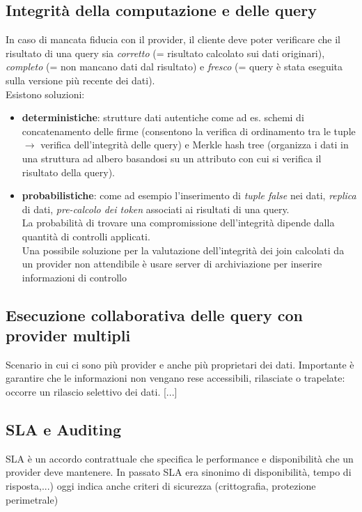 \subsection{Integrità della computazione e delle query}
In caso di mancata fiducia con il provider, il cliente deve poter verificare che il risultato di una query sia \textit{corretto} (= risultato calcolato sui dati originari), \textit{completo} (= non mancano dati dal risultato) e \textit{fresco} (= query è stata eseguita sulla versione più recente dei dati).\\
Esistono soluzioni:
\begin{itemize}
    \item \textbf{deterministiche}: strutture dati autentiche come ad es. schemi di concatenamento delle firme (consentono la verifica di ordinamento tra le tuple $\xrightarrow{}$ verifica dell'integrità delle query) e Merkle hash tree (organizza i dati in una struttura ad albero basandosi su un attributo con cui si verifica il risultato della query).
    \item \textbf{probabilistiche}: come ad esempio l'inserimento di \textit{tuple false} nei dati, \textit{replica} di dati, \textit{pre-calcolo dei token} associati ai risultati di una query.\\
    La probabilità di trovare una compromissione dell'integrità dipende dalla quantità di controlli applicati.\\
    Una possibile soluzione per la valutazione dell'integrità dei join calcolati da un provider non attendibile è usare server di archiviazione per inserire informazioni di controllo    
\end{itemize}
\subsection{Esecuzione collaborativa delle query con provider multipli}
Scenario in cui ci sono più provider e anche più proprietari dei dati. Importante è garantire che le informazioni non vengano rese accessibili, rilasciate o trapelate: occorre un rilascio selettivo dei dati. [...]
\subsection{SLA e Auditing}
SLA è un accordo contrattuale che specifica le performance e disponibilità che un provider deve mantenere. In passato SLA era sinonimo di disponibilità, tempo di risposta,...) oggi indica anche criteri di sicurezza (crittografia, protezione perimetrale)

